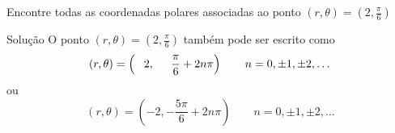 \begin{question}
  Encontre todas as coordenadas polares associadas ao ponto
  \(
    \left(r, \theta\right) =
    \left(2, \frac{\pi}{6}\right)
  \)
\end{question}

\begin{resolution}{Solução}
  O ponto
  \(
    \left(r, \theta\right) =
    \left(2, \frac{\pi}{6}\right)
  \)
  também pode ser escrito como
  \[
    \left(r, \theta\right) =
    \left(\hphantom{-} 2, \hphantom{-5}\,\frac{\pi}{6}+2n\pi\right)
    \qquad n=0, \pm 1, \pm 2, \dots
  \]
  ou
  \[
    \left(r, \theta\right) =
    \left(-2, -\frac{5\pi}{6}+2n\pi\right)
    \qquad n=0, \pm 1, \pm 2, \dots
  \]
\end{resolution}

